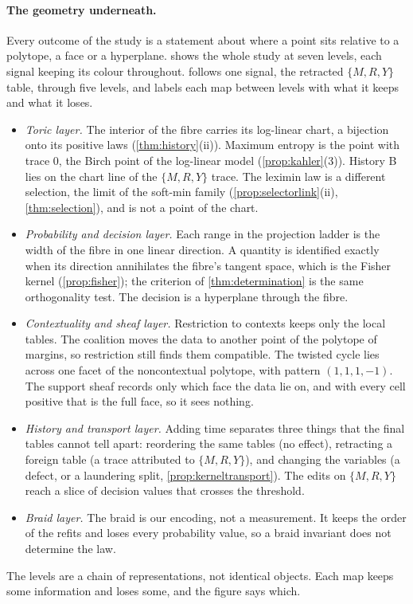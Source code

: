 \documentclass[11pt]{article}
\theoremstyle{definition}\newtheorem{definition}[theorem]{Definition}\newtheorem{remark}[theorem]{Remark}\newtheorem{example}[theorem]{Example}\newtheorem{problem}[theorem]{Open problem}\crefname{problem}{Problem}{Problems}
\begin{document}
\paragraph{The geometry underneath.} Every outcome of the study is a statement about where a point sits relative to a polytope, a face or a hyperplane.  shows the whole study at seven levels, each signal keeping its colour throughout.  follows one signal, the retracted $\{M,R,Y\}$ table, through five levels, and labels each map between levels with what it keeps and what it loses.
\begin{itemize}
\item \emph{Toric layer.} The interior of the fibre carries its log-linear chart, a bijection onto its positive laws (\cref{thm:history}(ii)). Maximum entropy is the point with trace $0$, the Birch point of the log-linear model (\cref{prop:kahler}(3)). History B lies on the chart line of the $\{M,R,Y\}$ trace. The leximin law is a different selection, the limit of the soft-min family (\cref{prop:selectorlink}(ii), \cref{thm:selection}), and is not a point of the chart.
\item \emph{Probability and decision layer.} Each range in the projection ladder is the width of the fibre in one linear direction. A quantity is identified exactly when its direction annihilates the fibre's tangent space, which is the Fisher kernel (\cref{prop:fisher}); the criterion of \cref{thm:determination} is the same orthogonality test. The decision is a hyperplane through the fibre.
\item \emph{Contextuality and sheaf layer.} Restriction to contexts keeps only the local tables. The coalition moves the data to another point of the polytope of margins, so restriction still finds them compatible. The twisted cycle lies across one facet of the noncontextual polytope, with pattern $(1,1,1,-1)$. The support sheaf records only which face the data lie on, and with every cell positive that is the full face, so it sees nothing.
\item \emph{History and transport layer.} Adding time separates three things that the final tables cannot tell apart: reordering the same tables (no effect), retracting a foreign table (a trace attributed to $\{M,R,Y\}$), and changing the variables (a defect, or a laundering split, \cref{prop:kerneltransport}). The edits on $\{M,R,Y\}$ reach a slice of decision values that crosses the threshold.
\item \emph{Braid layer.} The braid is our encoding, not a measurement. It keeps the order of the refits and loses every probability value, so a braid invariant does not determine the law.
\end{itemize}
The levels are a chain of representations, not identical objects. Each map keeps some information and loses some, and the figure says which.
\end{document}

